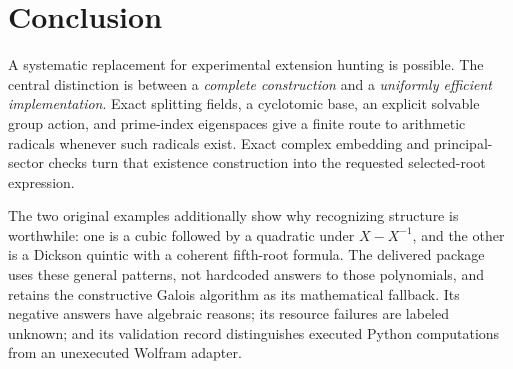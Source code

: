 \documentclass[11pt,letterpaper]{article}
\theoremstyle{definition}\newtheorem{definition}[theorem]{Definition}
\theoremstyle{remark}\newtheorem{remark}[theorem]{Remark}
\begin{document}
\section{Conclusion}
A systematic replacement for experimental extension hunting is possible. The central distinction is between a \emph{complete construction} and a \emph{uniformly efficient implementation}. Exact splitting fields, a cyclotomic base, an explicit solvable group action, and prime-index eigenspaces give a finite route to arithmetic radicals whenever such radicals exist. Exact complex embedding and principal-sector checks turn that existence construction into the requested selected-root expression.

The two original examples additionally show why recognizing structure is worthwhile: one is a cubic followed by a quadratic under $X-X^{-1}$, and the other is a Dickson quintic with a coherent fifth-root formula. The delivered package uses these general patterns, not hardcoded answers to those polynomials, and retains the constructive Galois algorithm as its mathematical fallback. Its negative answers have algebraic reasons; its resource failures are labeled unknown; and its validation record distinguishes executed Python computations from an unexecuted Wolfram adapter.

\appendix
\end{document}
